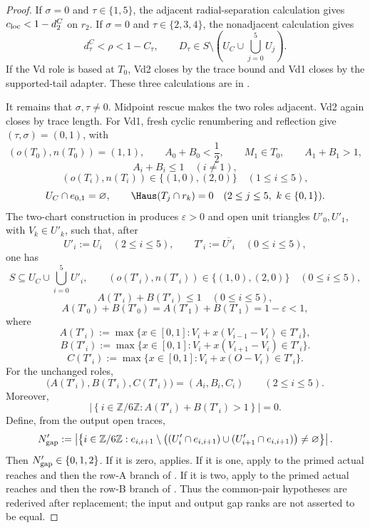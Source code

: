 

\begin{proof}
If \(\sigma=0\) and \(\tau\in\{1,5\}\), the adjacent radial-separation
calculation gives \(c_{\rm loc}<1-d_2^C\) on \(r_2\).  If
\(\sigma=0\) and \(\tau\in\{2,3,4\}\), the nonadjacent calculation gives
\[
 d_\tau^C<\rho<1-C_\tau,
 \qquad
 D_\tau\in
 S\setminus\left(U_C\cup\bigcup_{j=0}^5U_j\right).
\]
If the Vd role is based at \(T_0\), Vd2 closes by the trace bound and Vd1
closes by the supported-tail adapter.  These three calculations are in
.

It remains that \(\sigma,\tau\ne0\).  Midpoint rescue makes the two roles
adjacent.  Vd2 again closes by trace length.  For Vd1, fresh cyclic
renumbering and reflection give \((\tau,\sigma)=(0,1)\), with
\[
 (o(T_0),n(T_0))=(1,1),
 \qquad
 A_0+B_0<\frac12,
 \qquad
 M_1\in T_0,
 \qquad
 A_1+B_1>1,
\]
\[
 A_i+B_i\le1\quad(i\ne1),
\]
\[
 (o(T_i),n(T_i))\in\{(1,0),(2,0)\}
 \quad(1\le i\le5),
\]
\[
 U_C\cap e_{0,1}=\varnothing,
 \qquad
 \Haus(T_j\cap r_k)=0
 \quad(2\le j\le5,\ k\in\{0,1\}).
\]
The two-chart construction in
 produces
\(\varepsilon>0\) and open unit triangles \(U'_0,U'_1\), with \(V_k\in U'_k\),
such that, after
\[
 U'_i:=U_i\quad(2\le i\le5),
 \qquad
 T'_i:=\overline{U'_i}\quad(0\le i\le5),
\]
one has
\[
 S\subseteq U_C\cup\bigcup_{i=0}^5U'_i,
 \qquad
 (o(T'_i),n(T'_i))\in\{(1,0),(2,0)\}\quad(0\le i\le5),
\]
\[
 A(T'_i)+B(T'_i)\le1\quad(0\le i\le5),
\]
\[
 A(T'_0)+B(T'_0)=A(T'_1)+B(T'_1)=1-\varepsilon<1,
\]
where
\[
 A(T'_i):=\max\{x\in[0,1]:V_i+x(V_{i-1}-V_i)\in T'_i\},
\]
\[
 B(T'_i):=\max\{x\in[0,1]:V_i+x(V_{i+1}-V_i)\in T'_i\}.
\]
\[
 C(T'_i):=\max\{x\in[0,1]:V_i+x(O-V_i)\in T'_i\}.
\]
For the unchanged roles,
\[
 \bigl(A(T'_i),B(T'_i),C(T'_i)\bigr)=(A_i,B_i,C_i)
 \qquad(2\le i\le5).
\]
Moreover,
\[
 \left|\left\{i\in\mathbb Z/6\mathbb Z:
 A(T'_i)+B(T'_i)>1\right\}\right|=0.
\]
Define, from the output open traces,
\[
 N'_{\rm gap}:=
 \left|\left\{i\in\mathbb Z/6\mathbb Z:
 e_{i,i+1}\setminus
 \bigl((U'_i\cap e_{i,i+1})\cup(U'_{i+1}\cap e_{i,i+1})\bigr)
 \ne\varnothing\right\}\right|.
\]
Then \(N'_{\rm gap}\in\{0,1,2\}\).  If it is zero,
 applies.  If it is one, apply
 to the primed actual reaches and
then the row-A branch of .  If it is
two, apply
 to the primed actual reaches and
then the row-B branch of .  Thus the
common-pair hypotheses are rederived after replacement; the input and output
gap ranks are not asserted to be equal.
\end{proof}

